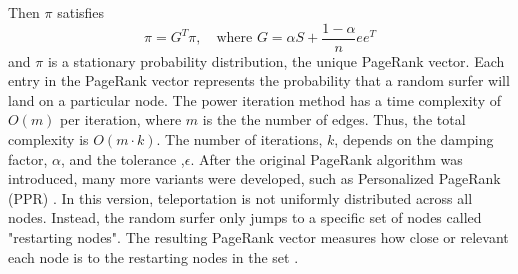 Then $\pi$ satisfies 
\begin{equation}
    \pi=G^T\pi, \quad \text{where $G=\alpha S +\frac{1-\alpha}{n}ee^T$}
\end{equation}
and $\pi$ is a stationary probability distribution, the unique PageRank vector.
Each entry in the PageRank vector represents the probability that a random surfer will land on a particular node. The power iteration method has a time complexity of $O(m)$ per iteration, where $m$ is the the number of edges. Thus, the total complexity is $O(m\cdot k)$. The number of iterations, $k$, depends on the damping factor, $\alpha$, and the tolerance ,$\epsilon$. After the original PageRank algorithm was introduced, many more variants were developed, such as Personalized PageRank (PPR) \cite{park_survey_2019}.
In this version, teleportation is not uniformly distributed across all nodes. Instead, the random surfer only jumps to a specific set of nodes called  "restarting nodes". The resulting PageRank vector measures how close or relevant each node is to the restarting nodes in the set \cite{priyanta_social_2019}. 

 


